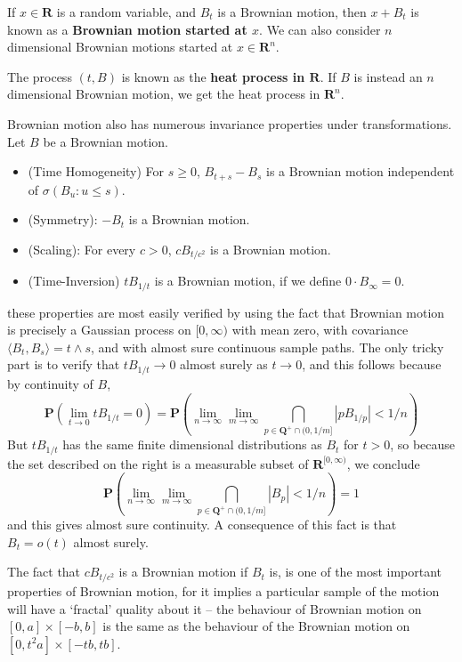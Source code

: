 \begin{example}
    If $x \in \mathbf{R}$ is a random variable, and $B_t$ is a Brownian motion, then $x + B_t$ is known as a {\bf Brownian motion started at $x$}. We can also consider $n$ dimensional Brownian motions started at $x \in \mathbf{R}^n$.
\end{example}

\begin{example}
    The process $(t,B)$ is known as the {\bf heat process in $\mathbf{R}$}. If $B$ is instead an $n$ dimensional Brownian motion, we get the heat process in $\mathbf{R}^n$.
\end{example}

Brownian motion also has numerous invariance properties under transformations. Let $B$ be a Brownian motion.
%
\begin{itemize}
    \item (Time Homogeneity) For $s \geq 0$, $B_{t+s} - B_s$ is a Brownian motion independent of $\sigma(B_u: u \leq s)$.

    \item (Symmetry): $-B_t$ is a Brownian motion.
    \item (Scaling): For every $c > 0$, $cB_{t/c^2}$ is a Brownian motion.
    \item (Time-Inversion) $tB_{1/t}$ is a Brownian motion, if we define $0 \cdot B_\infty = 0$.
\end{itemize}
%
these properties are most easily verified by using the fact that Brownian motion is precisely a Gaussian process on $[0,\infty)$ with mean zero, with covariance $\langle B_t, B_s \rangle = t \wedge s$, and with almost sure continuous sample paths. The only tricky part is to verify that $tB_{1/t} \to 0$ almost surely as $t \to 0$, and this follows because by continuity of $B$,
%
\[ \mathbf{P} \left( \lim_{t \to 0} tB_{1/t} = 0 \right) = \mathbf{P} \left( \lim_{n \to \infty} \lim_{m \to \infty} \bigcap_{p \in \mathbf{Q}^+ \cap (0,1/m]} |pB_{1/p}| < 1/n \right) \]
%
But $tB_{1/t}$ has the same finite dimensional distributions as $B_t$ for $t > 0$, so because the set described on the right is a measurable subset of $\mathbf{R}^{[0,\infty)}$, we conclude
%
\[ \mathbf{P} \left( \lim_{n \to \infty} \lim_{m \to \infty} \bigcap_{p \in \mathbf{Q}^+ \cap (0,1/m]} |B_p| < 1/n \right) = 1 \]
%
and this gives almost sure continuity. A consequence of this fact is that $B_t = o(t)$ almost surely.

The fact that $cB_{t/c^2}$ is a Brownian motion if $B_t$ is, is one of the most important properties of Brownian motion, for it implies a particular sample of the motion will have a `fractal' quality about it -- the behaviour of Brownian motion on $[0,a] \times [-b,b]$ is the same as the behaviour of the Brownian motion on $[0,t^2a] \times [-tb,tb]$.

